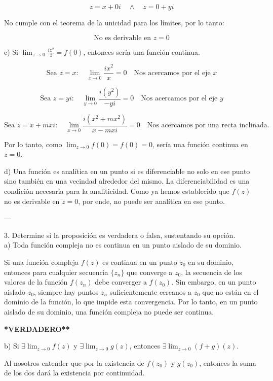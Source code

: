 \documentclass[a4paper,12pt]{article}
\begin{document}
\[
z = x + 0i \quad \land \quad z = 0 + yi
\]

No cumple con el teorema de la unicidad para los límites, por lo tanto:

\[
\text{No es derivable en } z = 0
\]

c) Si \(\lim_{z \to 0} \frac{iz^2}{\overline{z}} = f(0)\), entonces sería una función continua.

\[
\text{Sea } z = x: \quad \lim_{x \to 0} \frac{ix^2}{x} = 0 \quad \text{Nos acercamos por el eje } x
\]

\[
\text{Sea } z = yi: \quad \lim_{y \to 0} \frac{i(y^2)}{-yi} = 0 \quad \text{Nos acercamos por el eje } y
\]

\[
\text{Sea } z = x + mxi: \quad \lim_{x \to 0} \frac{i(x^2 + mx^2)}{x - mxi} = 0 \quad \text{Nos acercamos por una recta inclinada.}
\]

Por lo tanto, como \(\lim_{z \to 0} f(0) = f(0) = 0\), sería una función continua en \(z = 0\).

d) Una función es analítica en un punto si es diferenciable no solo en ese punto sino también en una vecindad alrededor del mismo. La diferenciabilidad es una condición necesaria para la analiticidad. Como ya hemos establecido que \(f(z)\) no es derivable en \(z = 0\), por ende, no puede ser analítica en ese punto.

---

3. Determine si la proposición es verdadera o falsa, sustentando su opción.\\

a) Toda función compleja no es continua en un punto aislado de su dominio.

Si una función compleja \(f(z)\) es continua en un punto \(z_0\) en su dominio, entonces para cualquier secuencia \(\{z_n\}\) que converge a \(z_0\), la secuencia de los valores de la función \(f(z_n)\) debe converger a \(f(z_0)\). Sin embargo, en un punto aislado \(z_0\), siempre hay puntos \(z_n\) suficientemente cercanos a \(z_0\) que no están en el dominio de la función, lo que impide esta convergencia. Por lo tanto, en un punto aislado de su dominio, una función compleja no puede ser continua.

{\bf **VERDADERO**}

b) Si \(\exists \lim_{z \to 0} f(z)\) y \(\exists \lim_{z \to 0} g(z)\), entonces \(\exists \lim_{z \to 0} (f + g)(z)\).

Al nosotros entender que por la existencia de \(f(z_0)\) y \(g(z_0)\), entonces la suma de los dos dará la existencia por continuidad.
\end{document}
